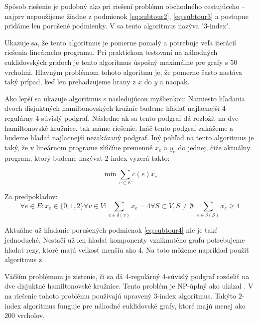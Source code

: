 Spôsob riešenie je podobný ako pri riešení problému obchodného cestujúceho -- najprv
nepoužijeme žiadne z podmienok \eqref{eq:subtour2}, \eqref{eq:subtour3} a postupne
pridáme len porušené podmienky. V \cite{duchenne} sa tento algoritmus nazýva "3-index".

Ukazuje sa, že tento algoritmus je pomerne pomalý a potrebuje veľa iterácií riešenia
lineárneho programu. Pri praktickom testovaní na náhodných euklidovských grafoch
je tento algoritmus úspešný maximálne pre grafy s $50$ vrcholmi. Hlavným problémom
tohoto algoritmu je, že pomerne často nastáva taký prípad, keď len prehadzujeme hrany z $x$ 
do $y$ a naopak. 

\smallskip

Ako lepší sa ukazuje algoritmus s nasledujúcou myšlienkou: Namiesto hľadania dvoch
disjuktných hamiltonovských kružníc budeme hľadať najlacnejší 4-regulárny 4-súvislý podgraf.
Následne ak sa tento podgraf dá rozložiť na dve hamiltonovské kružnice, tak máme riešenie.
Ináč tento podgraf zakážeme a budeme hľadať najlacnejší nezakázaný podgraf.
Iný pohľad na tento algoritmus je taký, že v lineárnom programe zlúčíne premenné $x_e$ a $y_e$ 
do jednej, čiže aktuálny program, ktorý budeme nazývať 2-index vyzerá takto:

$$\min \sum_{e \in E} c(e) x_e$$ 

Za predpokladov:
\begin{subequations}
\begin{equation}\forall e \in E: x_e \in \{0, 1, 2\}\end{equation}
\begin{equation}\forall v \in V: \sum_{e \in \delta(v)} x_e = 4\end{equation}
\begin{equation}\forall S \subset V, S \neq \emptyset: \sum_{e \in \delta(S)} x_e \geq 4
\label{eq:subtour4}
\end{equation}
\end{subequations}

Aktuálne už hľadanie porušených podmienok \eqref{eq:subtour4} nie je také jednoduché.
Nestačí už len hľadať komponenty vzniknutého grafu potrebujeme hľadať rezy, ktoré
majú veľkosť menšiu ako 4. Na toto môžeme napríklad použiť algoritmus z \cite{stoer}. 

Väčším problémom je zistenie, či sa dá 4-regulárný 4-súvislý podgraf rozdeliť na dve
disjuktné hamiltonovské kružnice. Tento problém je NP-úplný ako ukázal \cite{hamdecomp}.
V \cite{duchenne} na riešenie tohoto problému používajú upravený 3-index algoritmus.
Takýto 2-index algoritmus funguje pre náhodné euklidovské grafy, ktoré majú menej ako $200$
vrcholov.
